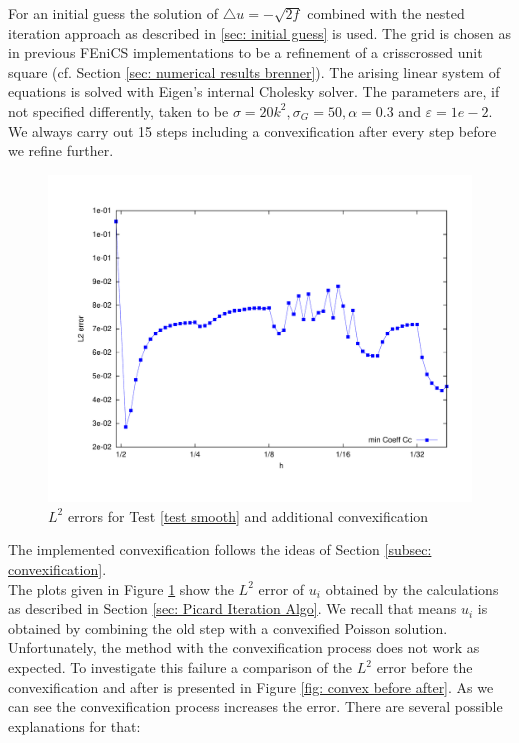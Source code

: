 For an initial guess the solution of $\triangle u = -\sqrt{2f}$ combined with the nested iteration approach as described in \ref{sec: initial guess} is used. The grid is chosen as in previous FEniCS implementations to be a refinement of a crisscrossed unit square (cf. Section \ref{sec: numerical results brenner}).
The arising linear system of equations is solved with Eigen's internal Cholesky solver.
The parameters are, if not specified differently, taken to be $\sigma=20 k^2, \sigma_G = 50, \alpha =
0.3$ and $\varepsilon = 1e-2$. We always carry out 15 steps including a convexification after every step before we refine further.
\begin{figure}[H]
\centering
	\includegraphics[scale =0.4]{plots/MA1_convexify.pdf}
	\caption{$L^2$ errors for Test \ref{test smooth} and additional convexification}
	\label{fig: l2 errors test smooth ourMethodConvex}
\end{figure}
The implemented convexification follows the ideas of Section \ref{subsec: convexification}. \\
The plots given in Figure \ref{fig: l2 errors test smooth ourMethodConvex} show the $L^2$ error of $u_i$ obtained by the calculations as described in Section \ref{sec: Picard Iteration Algo}. We recall that means $u_i$ is obtained by combining the old step with a convexified Poisson solution. Unfortunately, the method with the convexification process does not work as expected.
To investigate this failure a comparison of the $L^2$ error before the convexification and after is presented in Figure \ref{fig: convex before after}. As we can see the convexification process increases the error. There are several possible explanations for that:

